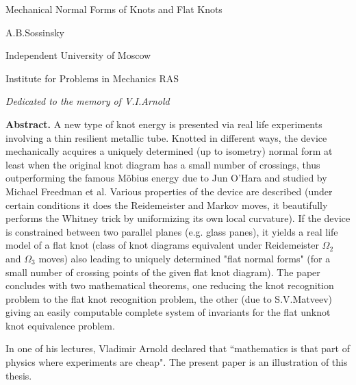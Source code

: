 \documentclass[12pt]{book}
\begin{document}
\newcommand{\pd}{\partial}
\newcommand{\R}{\mathbb R}
\newcommand{\C}{\mathbb C}
\newcommand{\Sb}{\mathbb S}
\newcommand{\D}{\mathbb D}
\newcommand{\Z}{\mathbb Z}
\newcommand{\N}{\mathbb N}

\newcommand{\spt}{\operatorname{supp}}
\newcommand{\Hom}{\operatorname{Hom}}
\newcommand{\Ker}{\operatorname{Ker}}
\newcommand{\id}{\operatorname{id}}
\newcommand{\Der}{\operatorname{Der}}
\newcommand{\sh}{\operatorname{sh}}
\newcommand{\ch}{\operatorname{ch}}
\newcommand{\tnh}{\operatorname{tnh}}
\newcommand{\ctnh}{\operatorname{ctnh}}
\newcommand{\ctg}{\operatorname{ctg}}
\newcommand{\tg}{\operatorname{tg}}
\newcommand{\tgh}{\operatorname{tgh}}


\centerline{{\sc Mechanical Normal Forms of Knots and Flat Knots}}

\medskip  
\centerline{{\sc A.B.Sossinsky}} 

\medskip
\centerline{Independent University of Moscow}

\centerline{Institute for Problems in Mechanics RAS} 
\bigskip

\begin{flushright}
{\it Dedicated to the memory of V.I.Arnold}
\end{flushright}

\small
{\bf Abstract.} A new type of knot energy is presented via real life experiments involving a thin resilient
metallic tube. Knotted in different ways, the device mechanically acquires a uniquely determined (up to
isometry) normal form at least when the original knot diagram has a small number of crossings, thus
outperforming the famous M\"obius energy due to Jun O'Hara and studied by Michael Freedman et al.
Various properties of the device are described (under certain conditions it does the Reidemeister and
Markov moves, it beautifully performs the Whitney trick by uniformizing its own local curvature). If the
device is constrained between two parallel planes (e.g. glass panes), it yields a real life model of a flat knot
(class of knot diagrams equivalent under Reidemeister $\Omega_2$ and $\Omega_3$ moves) also leading to
uniquely determined "flat normal forms" (for a small number of crossing points of the given flat knot diagram).
The paper concludes with two mathematical theorems, one reducing the knot recognition problem to the
flat knot recognition problem, the other (due to S.V.Matveev) giving an easily computable complete system
of invariants for the flat unknot knot equivalence problem. 
\normalsize


\bigskip
In one of his lectures, Vladimir Arnold declared that ``mathematics is that part of physics  where experiments are cheap". The present paper is an illustration of this thesis.  
\end{document}
